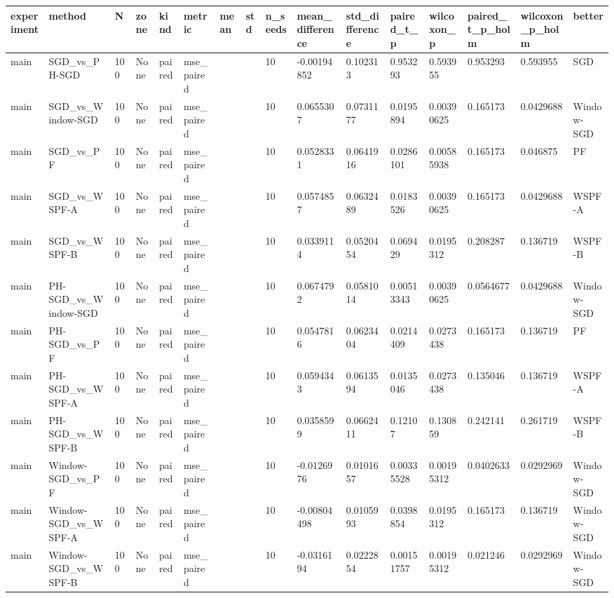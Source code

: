 \begin{tabular}{llllllllllllllll}
\hline
experiment & method & N & zone & kind & metric & mean & std & n\_seeds & mean\_difference & std\_difference & paired\_t\_p & wilcoxon\_p & paired\_t\_p\_holm & wilcoxon\_p\_holm & better \\
\hline
main & SGD\_vs\_PH-SGD & 100 & None & paired & mse\_paired &  &  & 10 & -0.00194852 & 0.102313 & 0.953293 & 0.593955 & 0.953293 & 0.593955 & SGD \\
main & SGD\_vs\_Window-SGD & 100 & None & paired & mse\_paired &  &  & 10 & 0.0655307 & 0.0731177 & 0.0195894 & 0.00390625 & 0.165173 & 0.0429688 & Window-SGD \\
main & SGD\_vs\_PF & 100 & None & paired & mse\_paired &  &  & 10 & 0.0528331 & 0.0641916 & 0.0286101 & 0.00585938 & 0.165173 & 0.046875 & PF \\
main & SGD\_vs\_WSPF-A & 100 & None & paired & mse\_paired &  &  & 10 & 0.0574857 & 0.0632489 & 0.0183526 & 0.00390625 & 0.165173 & 0.0429688 & WSPF-A \\
main & SGD\_vs\_WSPF-B & 100 & None & paired & mse\_paired &  &  & 10 & 0.0339114 & 0.0520454 & 0.069429 & 0.0195312 & 0.208287 & 0.136719 & WSPF-B \\
main & PH-SGD\_vs\_Window-SGD & 100 & None & paired & mse\_paired &  &  & 10 & 0.0674792 & 0.0581014 & 0.00513343 & 0.00390625 & 0.0564677 & 0.0429688 & Window-SGD \\
main & PH-SGD\_vs\_PF & 100 & None & paired & mse\_paired &  &  & 10 & 0.0547816 & 0.0623404 & 0.0214409 & 0.0273438 & 0.165173 & 0.136719 & PF \\
main & PH-SGD\_vs\_WSPF-A & 100 & None & paired & mse\_paired &  &  & 10 & 0.0594343 & 0.0613594 & 0.0135046 & 0.0273438 & 0.135046 & 0.136719 & WSPF-A \\
main & PH-SGD\_vs\_WSPF-B & 100 & None & paired & mse\_paired &  &  & 10 & 0.0358599 & 0.0662411 & 0.12107 & 0.130859 & 0.242141 & 0.261719 & WSPF-B \\
main & Window-SGD\_vs\_PF & 100 & None & paired & mse\_paired &  &  & 10 & -0.0126976 & 0.0101657 & 0.00335528 & 0.00195312 & 0.0402633 & 0.0292969 & Window-SGD \\
main & Window-SGD\_vs\_WSPF-A & 100 & None & paired & mse\_paired &  &  & 10 & -0.00804498 & 0.0105993 & 0.0398854 & 0.0195312 & 0.165173 & 0.136719 & Window-SGD \\
main & Window-SGD\_vs\_WSPF-B & 100 & None & paired & mse\_paired &  &  & 10 & -0.0316194 & 0.0222854 & 0.00151757 & 0.00195312 & 0.021246 & 0.0292969 & Window-SGD \\

\end{tabular}
